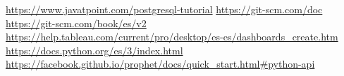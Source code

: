 \documentclass[a4paper, 12pt]{book}
\begin{document}
\begin{thebibliography}{0}
\bibitem{} \url{https://www.javatpoint.com/postgresql-tutorial} %
\bibitem{} \url{https://git-scm.com/doc} %
\bibitem{} \url{https://git-scm.com/book/es/v2} %
\bibitem{}  \url{https://help.tableau.com/current/pro/desktop/es-es/dashboards_create.htm}
\bibitem{} \url{https://docs.python.org/es/3/index.html}
\bibitem{} \url{https://facebook.github.io/prophet/docs/quick_start.html#python-api} %
\end{thebibliography}
\end{document}
